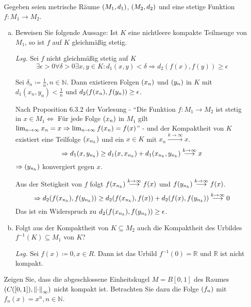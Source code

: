 \documentclass{scrreprt}
\begin{document}
Gegeben seien metrische Räume $\qty(M_1, d_1)$, $\qty(M_2, d_2)$ und eine
stetige Funktion $f \colon M_1 \to M_2$.
\begin{enumerate}[a)]
\item Beweisen Sie folgende Aussage:
  Ist $K$ eine nichtleere kompakte Teilmenge von $M_1$, so ist $f$ auf $K$
  gleichmäßig stetig.

  \textit{Lsg.} Sei $f$ nicht gleichmäßig stetig auf $K$
  \[
    \exists \epsilon > 0 \forall \delta > 0 \exists x, y \in K \colon
    d_1(x, y) < \delta \Rightarrow d_2(f(x), f(y)) \geq \epsilon
  \]

  Sei $\delta_n \coloneqq \frac{1}{n}, n \in \mathbb{N}$.
  Dann existieren Folgen $\qty(x_n)$ und $\qty(y_n)$ in $K$ mit
  $d_1(x_n, y_n) < \frac{1}{n}$ und
  $d_2 \qty(f\qty(x_n), f\qty(y_n)) \geq \epsilon$.

  Nach Proposition 6.3.2 der Vorlesung -
  ``Die Funktion $f \colon M_1 \to M_2$ ist stetig in $x \in M_1 \iff $
  Für jede Folge $\qty(x_n)$ in $M_1$ gilt
  $\lim_{n \to \infty} x_n = x \Rightarrow \lim_{n \to \infty} f\qty(x_n) = f(x)$''
  - und der Kompaktheit von $K$ existiert eine Teilfolge $\qty(x_{n_k})$
  und ein $x \in K$ mit $x_n \overset{k \to \infty}\longrightarrow x$.
  \[
    \Rightarrow d_1\qty(x, y_{n_k}) \geq d_1\qty(x, x_{n_k}) + d_1\qty(x_{n_k}, y_{n_k})
    \overset{k \to \infty}\longrightarrow x
  \]
  $\Rightarrow \qty(y_{n_k})$ konvergiert gegen $x$.

  Aus der Stetigkeit von $f$ folgt
  $f\qty(x_{n_k}) \overset{k \to \infty}\longrightarrow f(x)$ und
  $f\qty(y_{n_k}) \overset{k \to \infty}\longrightarrow f(x)$.
  \[
    \Rightarrow d_2\qty(f\qty(x_{n_k}), f\qty(y_{n_k}))
    \geq d_2\qty(f\qty(x_{n_k}), f(x)) + d_2\qty(f(x), f\qty(y_{n_k}))
    \overset{k \to \infty}\longrightarrow 0
  \]
  Das ist ein Widerspruch zu $d_2\qty(f\qty(x_{n_k}), f\qty(y_{n_k})) \geq \epsilon$.

\item Folgt aus der Kompaktheit von $K \subseteq M_2$ auch die Kompaktheit
  des Urbildes $f^{-1}(K) \subseteq M_1$ von $K$?

  \textit{Lsg.} Sei $f(x) \coloneqq 0, x \in R$.
  Dann ist das Urbild $f^{-1}(\qty{0}) = \mathbb{R}$ und $\mathbb{R}$ ist nicht kompakt.

\end{enumerate}

\noindent
Zeigen Sie, dass die abgeschlossene Einheitskugel
$M = B[0, 1]$ des Raumes
$\qty(C([0, 1]), \norm{\cdot}_{\infty})$ nicht kompakt ist.
Betrachten Sie dazu die Folge $\qty(f_n)$ mit $f_n(x) = x^n, n \in \mathbb{N}$. \\
\end{document}

